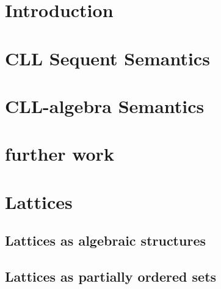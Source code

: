 \maketitle



\section{Introduction}


\section{CLL Sequent Semantics}


\section{CLL-algebra Semantics}






% 
%



% 
% 
% 


\section{further work}


\appendix 

\section{Lattices}




	\subsection{Lattices as algebraic structures}
		
	\subsection{Lattices as partially ordered sets}
		





 
